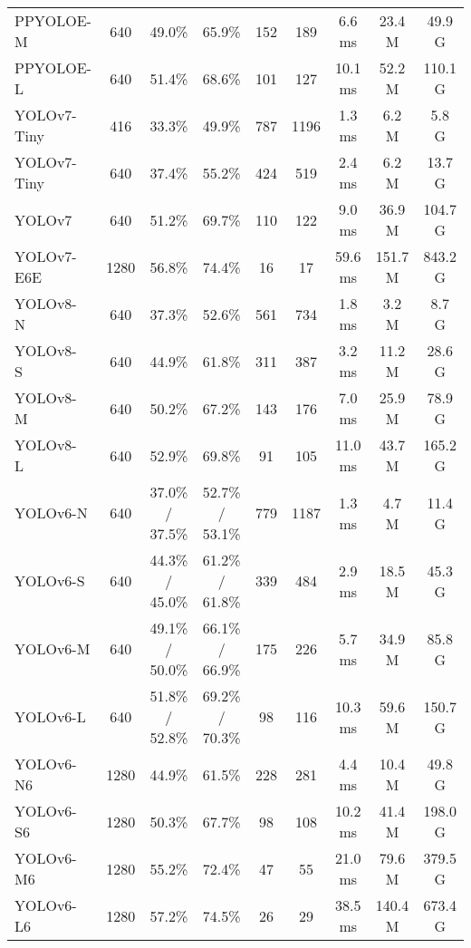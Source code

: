 \documentclass[10pt,twocolumn,letterpaper]{article}
\begin{document}
\begin{table*}[h]
{\begin{tabular}{l|c|c|c|c|c|c|c|c}
        PPYOLOE-M~\cite{xu2022ppyoloe} & 640 & 49.0\% & 65.9\% & 152 & 189 & 6.6 ms& 23.4 M& 49.9 G \\
        PPYOLOE-L~\cite{xu2022ppyoloe} & 640 & 51.4\% & 68.6\% & 101 & 127 & 10.1 ms& 52.2 M& 110.1 G \\
        \midrule
        \midrule
        YOLOv7-Tiny~\cite{wang2022yolov7} & 416 &33.3\% & 49.9\% & 787  &1196  & 1.3 ms & 6.2 M & 5.8 G \\
        YOLOv7-Tiny~\cite{wang2022yolov7} & 640 &37.4\% & 55.2\% & 424  & 519 & 2.4 ms & 6.2 M & 13.7 G \\
        YOLOv7~\cite{wang2022yolov7}  & 640 & 51.2\% & 69.7\% & 110 & 122 & 9.0 ms & 36.9 M& 104.7 G \\
        YOLOv7-E6E~\cite{wang2022yolov7}  & 1280 & 56.8\% & 74.4\% & 16 & 17 & 59.6 ms & 151.7 M& 843.2 G \\
        \midrule
        \midrule
        YOLOv8-N~\cite{yolov8} & 640 & 37.3\% & 52.6\% & 561  & 734 & 1.8 ms& 3.2 M & 8.7 G\\
        YOLOv8-S~\cite{yolov8} & 640 & 44.9\% & 61.8\% & 311 & 387 & 3.2 ms& 11.2 M & 28.6 G \\
        YOLOv8-M~\cite{yolov8} & 640 & 50.2\% & 67.2\% & 143 & 176 & 7.0 ms& 25.9 M & 78.9 G  \\
        YOLOv8-L~\cite{yolov8} & 640 & 52.9\% & 69.8\% & 91  & 105 & 11.0 ms& 43.7 M & 165.2 G  \\


        \midrule
        \midrule
        YOLOv6-N & 640 &  37.0\% / 37.5\% & 52.7\% / 53.1\% & 779 & 1187 &1.3 ms &4.7 M & 11.4 G \\
        YOLOv6-S & 640 & 44.3\% / 45.0\% & 61.2\% / 61.8\% & 339 & 484 &2.9 ms & 18.5 M & 45.3 G \\
        YOLOv6-M & 640 & 49.1\% / 50.0\% & 66.1\% / 66.9\% & 175 & 226 & 5.7 ms & 34.9 M & 85.8 G \\
        YOLOv6-L & 640 & 51.8\% / 52.8\% & 69.2\% / 70.3\% & 98  & 116 &10.3 ms & 59.6 M & 150.7 G \\
        
        \midrule
        YOLOv6-N6 & 1280 & 44.9\% & 61.5\% &228 &281 & 4.4 ms &10.4 M &49.8 G\\
        YOLOv6-S6 & 1280 & 50.3\% &67.7\% & 98& 108&10.2 ms &41.4 M &198.0 G\\
        YOLOv6-M6 & 1280 & 55.2\% &72.4\% &47 & 55&21.0 ms &79.6 M &379.5 G\\
        YOLOv6-L6 & 1280 & 57.2\% &74.5\%  & 26 & 29 & 38.5 ms & 140.4 M & 673.4 G\\


\end{tabular}}
\end{table*}
\end{document}
